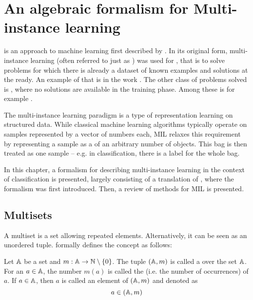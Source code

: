 \chapter{An algebraic formalism for Multi-instance learning}\label{chap:MIL}


 is an approach to machine learning first described by \cite{dietterich_solving_1997}. In its original form, multi-instance learning (often referred to just as ) was used for , that is to solve problems for which there is already a dataset of known examples and solutions at the ready. An example of that is in the work \cite{amores_multiple_2013}. The other class of problems solved is , where no solutions are available in the training phase. Among these is for example \cite{chen_contextual_2012}.

The multi-instance learning paradigm is a type of representation learning on structured data. While classical machine learning algorithms typically operate on samples represented by a vector of numbers each, MIL relaxes this requirement by representing a sample as a  of an arbitrary number of objects. This bag is then treated as one sample -- e.g. in classification, there is a label for the whole bag.

In this chapter, a formalism for describing multi-instance learning in the context of classification is presented, largely consisting of a translation of \cite{dedic_hierarchicke_2017}, where the formalism was first introduced. Then, a review of methods for MIL is presented.

\section{Multisets}

A multiset is a set allowing repeated elements. Alternatively, it can be seen as an unordered tuple. \cite{knuth_art_1968} formally defines the concept as follows:

\begin{define}
	Let \( \mathbb{A} \) be a set and \( m : \mathbb{A} \to \mathbb{N} \setminus \left\{ 0 \right\} \). The tuple \( \left( \mathbb{A}, m \right) \) is called a  over the set \( \mathbb{A} \). For an \( a \in \mathbb{A} \), the number \( m \left( a \right) \) is called the  (i.e. the number of occurrences) of \( a \). If \( a \in \mathbb{A} \), then \( a \) is called an element of \( \left( \mathbb{A}, m \right) \) and denoted as
	\[ a \in \left( \mathbb{A}, m \right) \]
\end{define}


